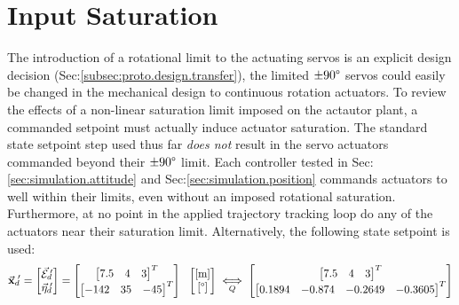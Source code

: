 \section{Input Saturation}
\label{sec:simulation.saturation}
The introduction of a rotational limit to the actuating servos is an explicit design decision (Sec:\ref{subsec:proto.design.transfer}), the limited $\pm 90\text{\textdegree}$ servos could easily be changed in the mechanical design to continuous rotation actuators. To review the effects of a non-linear saturation limit imposed on the actautor plant, a commanded setpoint must actually induce actuator saturation. The standard state setpoint step used thus far \emph{does not} result in the servo actuators commanded beyond their $\pm 90\text{\textdegree}$ limit. Each controller tested in Sec:\ref{sec:simulation.attitude} and Sec:\ref{sec:simulation.position} commands actuators to well within their limits, even without an imposed rotational saturation. Furthermore, at no point in the applied trajectory tracking loop do any of the actuators near their saturation limit. Alternatively, the following state setpoint is used:
\begin{equation}\label{eq:saturation-state-step}
\vec{\mathbf{x}}_d\text{}\hspace{-2pt}'=
\begin{bmatrix}
\vec{\mathcal{E}}_d\text{}\hspace{-2pt}'\\
\vec{\eta}_d\text{}\hspace{-2pt}'
\end{bmatrix}
=\begin{bmatrix}
\begin{bmatrix}
7.5 & 4 & 3
\end{bmatrix}^T
\\
\begin{bmatrix}
-142 & 35 & -45
\end{bmatrix}^T
\end{bmatrix}~~\begin{bmatrix}
[\text{m}]\\
[\text{\textdegree}]
\end{bmatrix}\underset{Q}{\iff}\begin{bmatrix}
\begin{bmatrix}
7.5 & 4 & 3
\end{bmatrix}^T\\
\begin{bmatrix}
0.1894 & -0.874 & -0.2649 & -0.3605
\end{bmatrix}^T
\end{bmatrix}
\end{equation}
